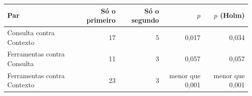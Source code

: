\begin{tabular}{lrrrr}
\toprule
Par & Só o primeiro & Só o segundo & $p$ & $p$ (Holm) \\
\midrule
Consulta contra Contexto & 17 & 5 & 0,017 & 0,034 \\
Ferramentas contra Consulta & 11 & 3 & 0,057 & 0,057 \\
Ferramentas contra Contexto & 23 & 3 & menor que 0,001 & menor que 0,001 \\
\bottomrule
\end{tabular}
